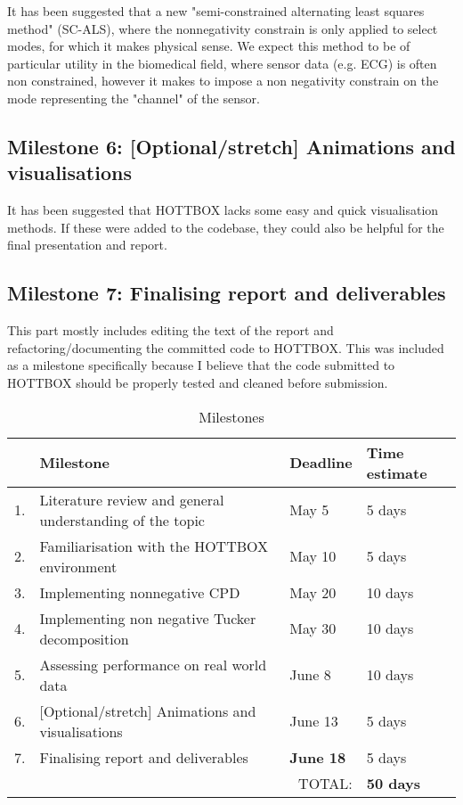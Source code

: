 \documentclass{article}
\begin{document}
It has been suggested that a new "semi-constrained alternating least squares method" (SC-ALS), where the nonnegativity constrain is only applied to select modes, for which it makes physical sense. We expect this method to be of particular utility in the biomedical field, where sensor data (e.g. ECG) is often non constrained, however it makes to impose a non negativity constrain on the mode representing the "channel" of the sensor. 

\subsection{Milestone 6:  [Optional/stretch] Animations and visualisations}

It has been suggested that HOTTBOX lacks some easy and quick visualisation methods. If these were added to the codebase, they could also be helpful for the final presentation and report.

\subsection{Milestone 7:  Finalising report and deliverables}

This part mostly includes editing the text of the report and refactoring/documenting the committed code to HOTTBOX. This was included as a milestone specifically because I believe that the code submitted to HOTTBOX should be properly tested and cleaned before submission.

\begin{table}[ht]
    \centering
    \begin{tabular}{r|X|l|l}
        & Milestone & Deadline & Time estimate \\ \hline
         1. & Literature review and general understanding of the topic & May 5 & 5 days \\
          2. & Familiarisation with the HOTTBOX environment & May 10 & 5 days \\
           3. & Implementing nonnegative CPD & May 20 & 10 days\\
            4. & Implementing non negative Tucker decomposition & May 30 & 10 days\\
             5. & Assessing performance on real world data & June 8 & 10 days \\
            6. & [Optional/stretch] Animations and visualisations & June 13 & 5 days \\
            7. & Finalising report and deliverables & \textbf{June 18} & 5 days \\
            \multicolumn{3}{r|}{TOTAL:} & \textbf{50 days} \\
    \end{tabular}
    \caption{Milestones}
    \label{tab:milestones}
\end{table}
\end{document}
